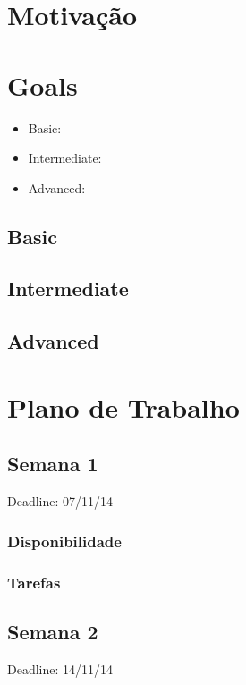 \documentclass[a4paper]{article}
\begin{document}


\tableofcontents
\pagebreak

\section{Motivação}

\pagebreak

\section{Goals}

\begin{itemize}
	\item Basic:
	\item Intermediate:
	\item Advanced:
\end{itemize}

\subsection{Basic}

\subsection{Intermediate}

\subsection{Advanced}

\pagebreak

\section{Plano de Trabalho}

\subsection{Semana 1}
Deadline: 07/11/14
\subsubsection{Disponibilidade}
\subsubsection{Tarefas}

\subsection{Semana 2}
Deadline: 14/11/14
\end{document}
